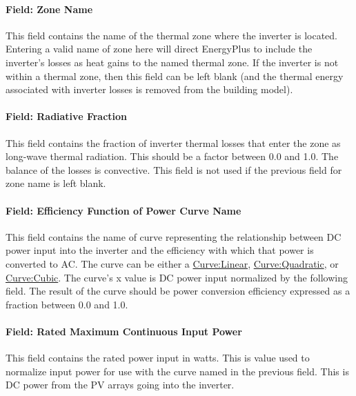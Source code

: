 \paragraph{Field: Zone Name}\label{field-zone-name-2-001}

This field contains the name of the thermal zone where the inverter is located. Entering a valid name of zone here will direct EnergyPlus to include the inverter's losses as heat gains to the named thermal zone. If the inverter is not within a thermal zone, then this field can be left blank (and the thermal energy associated with inverter losses is removed from the building model).

\paragraph{Field: Radiative Fraction}\label{field-radiative-fraction-2}

This field contains the fraction of inverter thermal losses that enter the zone as long-wave thermal radiation. This should be a factor between 0.0 and 1.0. The balance of the losses is convective. This field is not used if the previous field for zone name is left blank.

\paragraph{Field: Efficiency Function of Power Curve Name}\label{field-efficiency-function-of-power-curve-name}

This field contains the name of curve representing the relationship between DC power input into the inverter and the efficiency with which that power is converted to AC. The curve can be either a \hyperref[curvelinear]{Curve:Linear}, \hyperref[curvequadratic]{Curve:Quadratic}, or \hyperref[curvecubic]{Curve:Cubic}. The curve's x value is DC power input normalized by the following field. The result of the curve should be power conversion efficiency expressed as a fraction between 0.0 and 1.0.

\paragraph{Field: Rated Maximum Continuous Input Power}\label{field-rated-maximum-continuous-input-power}

This field contains the rated power input in watts. This is value used to normalize input power for use with the curve named in the previous field. This is DC power from the PV arrays going into the inverter.

